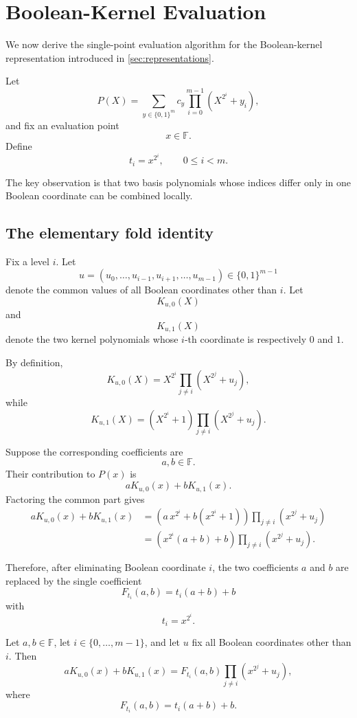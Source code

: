 \section{Boolean-Kernel Evaluation}
\label{sec:evaluation}

We now derive the single-point evaluation algorithm for the
Boolean-kernel representation introduced in \cref{sec:representations}.

Let
\[
P(X)
=
\sum_{y\in\{0,1\}^m}
c_y
\prod_{i=0}^{m-1}
\left(X^{2^i}+y_i\right),
\]
and fix an evaluation point
\[
x\in\mathbb{F}.
\]
Define
\[
t_i=x^{2^i},
\qquad
0\le i<m.
\]

The key observation is that two basis polynomials whose indices differ
only in one Boolean coordinate can be combined locally.

\subsection{The elementary fold identity}

Fix a level \(i\).  Let
\[
u=(u_0,\ldots,u_{i-1},u_{i+1},\ldots,u_{m-1})
\in\{0,1\}^{m-1}
\]
denote the common values of all Boolean coordinates other than \(i\).
Let
\[
K_{u,0}(X)
\]
and
\[
K_{u,1}(X)
\]
denote the two kernel polynomials whose \(i\)-th coordinate is respectively
\(0\) and \(1\).

By definition,
\[
K_{u,0}(X)
=
X^{2^i}
\prod_{j\ne i}
\left(X^{2^j}+u_j\right),
\]
while
\[
K_{u,1}(X)
=
\left(X^{2^i}+1\right)
\prod_{j\ne i}
\left(X^{2^j}+u_j\right).
\]

Suppose the corresponding coefficients are
\[
a,b\in\mathbb{F}.
\]
Their contribution to \(P(x)\) is
\[
aK_{u,0}(x)+bK_{u,1}(x).
\]
Factoring the common part gives
\[
\begin{aligned}
aK_{u,0}(x)+bK_{u,1}(x)
&=
\left(
a\,x^{2^i}
+
b(x^{2^i}+1)
\right)
\prod_{j\ne i}
\left(x^{2^j}+u_j\right)
\\
&=
\left(
x^{2^i}(a+b)+b
\right)
\prod_{j\ne i}
\left(x^{2^j}+u_j\right).
\end{aligned}
\]

Therefore, after eliminating Boolean coordinate \(i\), the two
coefficients \(a\) and \(b\) are replaced by the single coefficient
\[
\boxed{
F_{t_i}(a,b)
=
t_i(a+b)+b
}
\]
with
\[
t_i=x^{2^i}.
\]

\begin{lemma}
\label{lem:pair-fold}
Let \(a,b\in\mathbb{F}\), let \(i\in\{0,\ldots,m-1\}\), and let \(u\)
fix all Boolean coordinates other than \(i\).  Then
\[
aK_{u,0}(x)+bK_{u,1}(x)
=
F_{t_i}(a,b)
\prod_{j\ne i}
\left(x^{2^j}+u_j\right),
\]
where
\[
F_{t_i}(a,b)=t_i(a+b)+b.
\]
\end{lemma}

